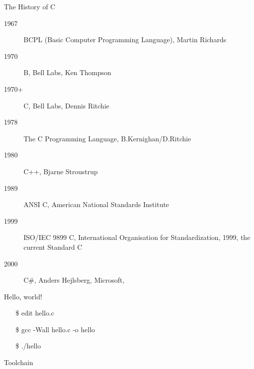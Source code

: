 \begin{frame}{The History of C}
  \begin{description}
  \item[1967] \alert{BCPL} (Basic Computer Programming Language), Martin Richards
  \item[1970] \alert{B}, Bell Labs, Ken Thompson
  \item[1970+] \alert{C}, Bell Labs, Dennis Ritchie
  \item[1978] \alert{The C Programming Language}, B.Kernighan/D.Ritchie
  \item[1980] \alert{C++}, Bjarne Stroustrup
  \item[1989] \alert{ANSI C}, American National Standards Institute
  \item[1999] \alert{ISO/IEC 9899 C}, International Organisation for Standardization, 1999, the
    current Standard C
  \item[2000] \alert{C\#}, Anders Hejlsberg, Microsoft, 
  \end{description}
\end{frame}

\begin{frame}{Hello, world!}
  \begin{center}
  \end{center}
  {\ttfamily
    \begin{itemize}
    \item[\$] edit hello.c
    \item[\$] gcc -Wall hello.c -o hello
    \item[\$] ./hello
    \end{itemize}}
\end{frame}

\begin{frame}{Toolchain}
\begin{center}
\end{center}
\end{frame}

